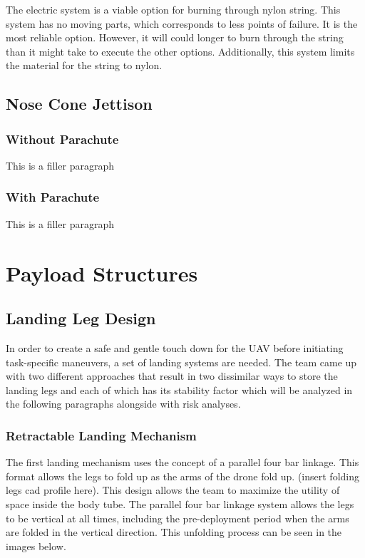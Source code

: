 		The electric system is a viable option for burning through nylon string. This system has no moving parts, which corresponds to less points of failure. It is the most reliable option. However, it will could longer to burn through the string than it might take to execute the other options. Additionally, this system limits the material for the string to nylon. 
	

	\subsection{Nose Cone Jettison}
		\subsubsection{Without Parachute}
			This is a filler paragraph
		
		\subsubsection{With Parachute}
			This is a filler paragraph

\section{Payload Structures}\label{PL:Tradeoffs:Structures}
	\subsection{Landing Leg Design}
		In order to create a safe and gentle touch down for the UAV before initiating task-specific maneuvers, a set of landing systems are needed. The team came up with two different approaches that result in two dissimilar ways to store the landing legs and each of which has its stability factor which will be analyzed in the following paragraphs alongside with risk analyses.
		\subsubsection{Retractable Landing Mechanism}
			The first landing mechanism uses the concept of a parallel four bar linkage. This format allows the legs to fold up as the arms of the drone fold up. (insert folding legs cad profile here). This design allows the team to maximize the utility of space inside the body tube. The parallel four bar linkage system allows the legs to be vertical at all times, including the pre-deployment period when the arms are folded in the vertical direction. This unfolding process can be seen in the images below.

